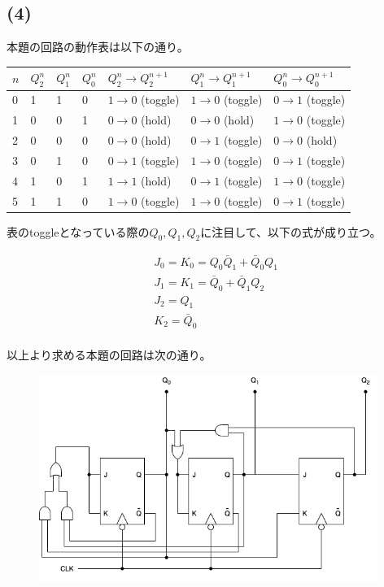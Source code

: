 \documentclass[a4paper,12pt,xelatex,ja=standard]{bxjsarticle}
\begin{document}
\subsection*{(4)}
本題の回路の動作表は以下の通り。
\begin{table}[H]
  \begin{tabular}{|l|l|l|l|l|l|l|}
  \hline
  $n$ & $Q^n_2$ & $Q^n_1$ & $Q^n_0$ & $Q^n_2 \to Q^{n+1}_2$ & $Q^n_1 \to Q^{n+1}_1$ & $Q^n_0 \to Q^{n+1}_0$ \\ \hline \hline
  0 & 1 & 1 & 0 & $1 \to 0$ (toggle) & $1 \to 0$ (toggle) & $0 \to 1$ (toggle) \\ \hline
  1 & 0 & 0 & 1 & $0 \to 0$ (hold)   & $0 \to 0$ (hold)   & $1 \to 0$ (toggle) \\ \hline
  2 & 0 & 0 & 0 & $0 \to 0$ (hold)   & $0 \to 1$ (toggle) & $0 \to 0$ (hold)   \\ \hline
  3 & 0 & 1 & 0 & $0 \to 1$ (toggle) & $1 \to 0$ (toggle) & $0 \to 1$ (toggle) \\ \hline
  4 & 1 & 0 & 1 & $1 \to 1$ (hold)   & $0 \to 1$ (toggle) & $1 \to 0$ (toggle) \\ \hline
  5 & 1 & 1 & 0 & $1 \to 0$ (toggle) & $1 \to 0$ (toggle) & $0 \to 1$ (toggle) \\ \hline
  \end{tabular}
\end{table}

表のtoggleとなっている際の$Q_0, Q_1, Q_2$に注目して、以下の式が成り立つ。

\begin{equation*}
  \begin{split}
    &J_0 = K_0 = Q_0 \bar{Q}_1 + \bar{Q}_0 Q_1 \\
    &J_1 = K_1 = \bar{Q}_0 + \bar{Q}_1 Q_2 \\
    &J_2 = Q_1 \\
    &K_2 = \bar{Q}_0 \\
  \end{split}
\end{equation*}

以上より求める本題の回路は次の通り。

\begin{figure}[H]
  \centering
  \includegraphics[width=11cm]{images/2013_counter.png}
\end{figure}
\end{document}
